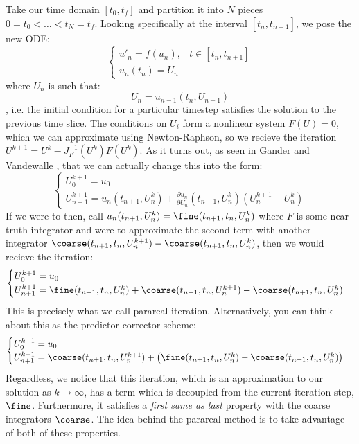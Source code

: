 Take our time domain $[t_0, t_f]$ and partition it into $N$ pieces $0 = t_0 <
\dots < t_N = t_f$. Looking specifically at the interval $[t_n, t_{n+1}]$, we
pose the new ODE:
\[
  \begin{cases}
    u'_n = f(u_n), & t \in [t_n, t_{n+1}] \\
    u_n(t_n) = U_n
  \end{cases}
\]
where $U_n$ is such that: $$U_n = u_{n-1}(t_n, U_{n-1}) $$
, i.e. the initial
condition for a particular timestep satisfies the solution to the previous time slice. The conditions on
$U_i$ form a nonlinear system $F(U) = 0$, which we can approximate using
Newton-Raphson, so we recieve the iteration $U^{k+1} = U^k -
J_F^{-1}(U^k)F(U^k)$. As it turns out, as seen in Gander and Vandewalle
\cite{gandervandewalle}, that we can actually change this into the form:
\[
  \begin{cases}
    U_0^{k+1} = u_0 \\
    U_{n+1}^{k+1} = u_n(t_{n+1}, U_n^k) + \frac{\partial u_n}{\partial
    U_n}(t_{n+1}, U_n^k)(U_n^{k+1} - U_n^k)
  \end{cases}
\]
If we were to then, call $u_n(t_{n+1}, U_n^k) = \fine(t_{n+1}, t_n, U_n^k)$
where $F$ is some near truth integrator and were to approximate the second
term with another integrator $\coarse(t_{n+1},t_n,U_n^{k+1}) -
\coarse(t_{n+1},t_n, U_n^k)$, then we would recieve the iteration:
\[
  \begin{cases}
    U_0^{k+1} = u_0 \\
    U_{n+1}^{k+1} = \fine(t_{n+1}, t_n, U_n^k) + \coarse(t_{n+1},t_n,U_n^{k+1})
    - \coarse(t_{n+1},t_n, U_n^k)
  \end{cases}
\]
This is precisely what we call parareal iteration. Alternatively, you can think
about this as the predictor-corrector scheme:
\[
  \begin{cases}
    U_0^{k+1} = u_0 \\
    U_{n+1}^{k+1} = \coarse(t_{n+1},t_n,U_n^{k+1}) + \left(\fine(t_{n+1}, t_n,
    U_n^k) - \coarse(t_{n+1},t_n, U_n^k)\right)
  \end{cases}
\]
Regardless, we notice that this iteration, which is an approximation to our
solution as $k \to \infty$, has a term which is decoupled from the current
iteration step, $\fine$. Furthermore, it satisfies a \textit{first same as last}
property with the coarse integrators $\coarse$. The idea behind the parareal
method is to take advantage of both of these properties.
